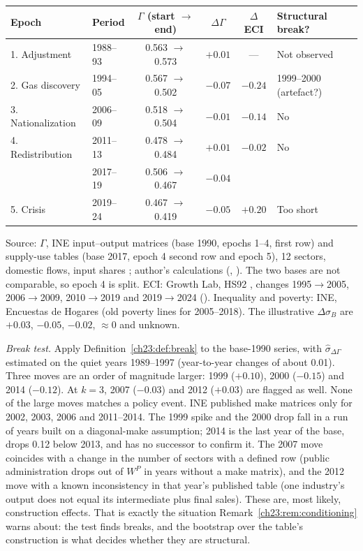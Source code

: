 \documentclass[../structural_economics_book.tex]{subfiles}
\begin{document}
\begin{example}
\begin{center}
\small
\begin{tabular}{llcccl}
\toprule
Epoch & Period & $\Gamma$ (start $\to$ end) & $\Delta\Gamma$ & $\Delta$ECI & Structural break? \\
\midrule
1. Adjustment & 1988--93 & 0.563 $\to$ 0.573 & $+0.01$ & --- & Not observed \\
2. Gas discovery & 1994--05 & 0.567 $\to$ 0.502 & $-0.07$ & $-0.24$ & 1999--2000 (artefact?) \\
3. Nationalization & 2006--09 & 0.518 $\to$ 0.504 & $-0.01$ & $-0.14$ & No \\
4. Redistribution & 2011--13 & 0.478 $\to$ 0.484 & $+0.01$ & $-0.02$ & No \\
 & 2017--19 & 0.506 $\to$ 0.467 & $-0.04$ & & \\
5. Crisis & 2019--24 & 0.467 $\to$ 0.419 & $-0.05$ & $+0.20$ & Too short \\
\bottomrule
\end{tabular}
\end{center}
\par{\footnotesize Source: $\Gamma$, INE input--output matrices (base 1990, epochs 1--4, first row) and supply-use tables (base 2017, epoch 4 second row and epoch 5), 12 sectors, domestic flows, input shares \citep{ine2026sut}; author's calculations (, ). The two bases are not comparable, so epoch 4 is split. ECI: Growth Lab, HS92 \citep{growthlab2026atlas}, changes 1995$\to$2005, 2006$\to$2009, 2010$\to$2019 and 2019$\to$2024 (). Inequality and poverty: INE, Encuestas de Hogares (old poverty lines for 2005--2018). The illustrative $\Delta\sigma_B$ are $+0.03$, $-0.05$, $-0.02$, $\approx 0$ and unknown.\par}

\emph{Break test.} Apply Definition~\ref{ch23:def:break} to the base-1990 series, with $\hat\sigma_{\Delta\Gamma}$ estimated on the quiet years 1989--1997 (year-to-year changes of about 0.01). Three moves are an order of magnitude larger: 1999 ($+0.10$), 2000 ($-0.15$) and 2014 ($-0.12$). At $k = 3$, 2007 ($-0.03$) and 2012 ($+0.03$) are flagged as well. None of the large moves matches a policy event. INE published make matrices only for 2002, 2003, 2006 and 2011--2014. The 1999 spike and the 2000 drop fall in a run of years built on a diagonal-make assumption; 2014 is the last year of the base, drops 0.12 below 2013, and has no successor to confirm it. The 2007 move coincides with a change in the number of sectors with a defined row (public administration drops out of $W^P$ in years without a make matrix), and the 2012 move with a known inconsistency in that year's published table (one industry's output does not equal its intermediate plus final sales). These are, most likely, construction effects. That is exactly the situation Remark~\ref{ch23:rem:conditioning} warns about: the test finds breaks, and the bootstrap over the table's construction is what decides whether they are structural.
\end{example}
\end{document}
